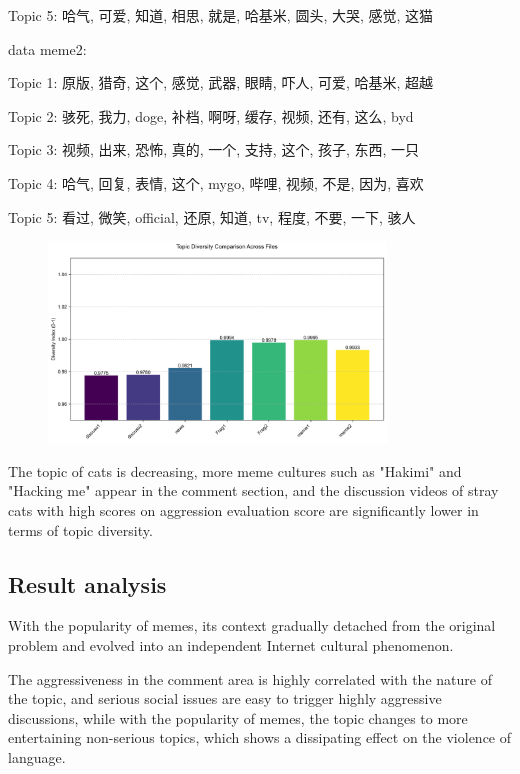 \documentclass[12pt,a4paper]{ctexart}
\theoremstyle{MyLineTheoremStyle}
\theoremstyle{MyBlockTheoremStyle}
\theoremstyle{MySubsubsectionStyle}
\begin{document}
Topic 5: 哈气, 可爱, 知道, 相思, 就是, 哈基米, 圆头, 大哭, 感觉, 这猫

data meme2:

Topic 1: 原版, 猎奇, 这个, 感觉, 武器, 眼睛, 吓人, 可爱, 哈基米, 超越

Topic 2: 骇死, 我力, doge, 补档, 啊呀, 缓存, 视频, 还有, 这么, byd

Topic 3: 视频, 出来, 恐怖, 真的, 一个, 支持, 这个, 孩子, 东西, 一只

Topic 4: 哈气, 回复, 表情, 这个, mygo, 哔哩, 视频, 不是, 因为, 喜欢

Topic 5: 看过, 微笑, official, 还原, 知道, tv, 程度, 不要, 一下, 骇人

\begin{figure}[htbp]
    \centering
    \includegraphics[width=0.8\textwidth]{img/topic_diversity.png}
\end{figure}
\newpage

The topic of cats is decreasing, more meme cultures such as "Hakimi" and "Hacking me" appear in the comment section, and the discussion videos of stray cats with high scores on aggression evaluation score are significantly lower in terms of topic diversity.

\subsection{Result analysis}

With the popularity of memes, its context gradually detached from the original problem and evolved into an independent Internet cultural phenomenon.

The aggressiveness in the comment area is highly correlated with the nature of the topic, and serious social issues are easy to trigger highly aggressive discussions, while with the popularity of memes, the topic changes to more entertaining non-serious topics, which shows a dissipating effect on the violence of language.
\end{document}
